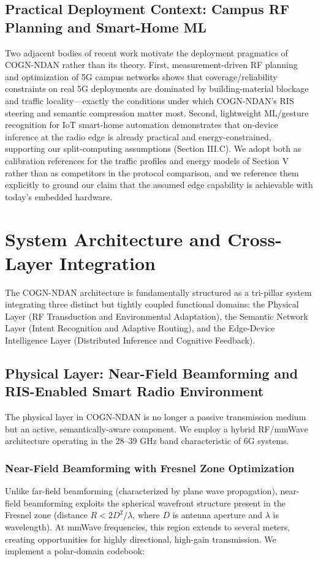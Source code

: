 \documentclass[journal]{IEEEtran}
\newcommand{\COGN}{COGN-NDAN}
\begin{document}
\subsection{Practical Deployment Context: Campus RF Planning and Smart-Home ML}
Two adjacent bodies of recent work motivate the deployment pragmatics of \COGN{} rather than its theory. First, measurement-driven RF planning and optimization of 5G campus networks \cite{rischke2021campus,khokher2024rf} shows that coverage/reliability constraints on real 5G deployments are dominated by building-material blockage and traffic locality---exactly the conditions under which \COGN{}'s RIS steering and semantic compression matter most. Second, lightweight ML/gesture recognition for IoT smart-home automation \cite{yang2021gesture} demonstrates that on-device inference at the radio edge is already practical and energy-constrained, supporting our split-computing assumptions (Section III.C). We adopt both as calibration references for the traffic profiles and energy models of Section V rather than as competitors in the protocol comparison, and we reference them explicitly to ground our claim that the assumed edge capability is achievable with today's embedded hardware.

\section{System Architecture and Cross-Layer Integration}

The \COGN{} architecture is fundamentally structured as a tri-pillar system integrating three distinct but tightly coupled functional domains: the Physical Layer (RF Transduction and Environmental Adaptation), the Semantic Network Layer (Intent Recognition and Adaptive Routing), and the Edge-Device Intelligence Layer (Distributed Inference and Cognitive Feedback).

\subsection{Physical Layer: Near-Field Beamforming and RIS-Enabled Smart Radio Environment}

The physical layer in \COGN{} is no longer a passive transmission medium but an active, semantically-aware component. We employ a hybrid RF/mmWave architecture operating in the 28--39 GHz band characteristic of 6G systems.

\subsubsection{Near-Field Beamforming with Fresnel Zone Optimization}
Unlike far-field beamforming (characterized by plane wave propagation), near-field beamforming exploits the spherical wavefront structure present in the Fresnel zone (distance $R < 2D^2/\lambda$, where $D$ is antenna aperture and $\lambda$ is wavelength). At mmWave frequencies, this region extends to several meters, creating opportunities for highly directional, high-gain transmission. We implement a polar-domain codebook:
\end{document}
